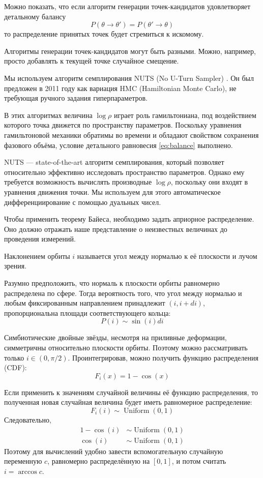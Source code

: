 Можно показать, что если алгоритм генерации точек-кандидатов удовлетворяет детальному балансу
\begin{equation}
P(\theta \to \theta') = P(\theta' \to \theta)
\label{eq:balance}
\end{equation}
то распределение принятых точек будет стремиться к искомому.

Алгоритмы генерации точек-кандидатов могут быть разными. Можно, например, просто добавлять к текущей точке случайное смещение.

Мы используем алгоритм семплирования NUTS (No U-Turn Sampler) \cite{NUTS}. Он был предложен в 2011 году как вариация HMC (Hamiltonian Monte Carlo), не требующая ручного задания гиперпараметров.

В этих алгоритмах величина $\log \rho$ играет роль гамильтониана, под воздействием которого точка движется по пространству параметров. Поскольку уравнения гамильтоновой механики обратимы во времени и обладают свойством сохранения фазового объёма, условие детального равновесия \eqref{eq:balance} выполнено.

NUTS --- state-of-the-art алгоритм семплирования, который позволяет относительно эффективно исследовать пространство параметров. Однако ему требуется возможность вычислять производные $\log \rho$, поскольку они входят в уравнения движения точки. Мы используем для этого автоматическое дифференциирование с помощью дуальных чисел.



Чтобы применить теорему Байеса, необходимо задать априорное распределение. Оно должно отражать наше представление о неизвестных величинах до проведения измерений.


Наклонением орбиты $i$ называется угол между нормалью к её плоскости и лучом зрения.

Разумно предположить, что нормаль к плоскости орбиты равномерно распределена по сфере. Тогда вероятность того, что угол между нормалью и любым фиксированным направлением принадлежит $(i, i + di)$, пропорциональна площади соответствующего кольца:
\[
P(i) \sim \sin(i) di
\]

Симбиотические двойные звёзды, несмотря на приливные деформации, симметричны относительно плоскости орбиты. Поэтому можно рассматривать только $i \in (0, \pi/2)$. Проинтегрировав, можно получить функцию распределения (CDF):
\[
F_i (x) = 1 - \cos(x)
\]

Если применить к значениям случайной величины её функцию распределения, то полученная новая случайная величина будет иметь равномерное распределение:
\[
F_i(i) \sim \operatorname{Uniform}(0, 1)
\]
Следовательно,
\[
\begin{aligned}
1 - \cos(i) &\sim \operatorname{Uniform}(0, 1) \\
\cos(i) &\sim \operatorname{Uniform}(0, 1)
\end{aligned}
\]
Поэтому для вычислений удобно завести вспомогательную случайную переменную $c$, равномерно распределённую на $[0, 1]$, и потом считать $i = \arccos c$.


